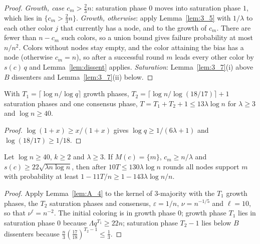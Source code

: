 \begin{proof}
  \emph{Growth, case $c_m > \frac23 n$}: saturation phase $0$ moves into
  saturation phase $1$, which lies in $\{c_m > \frac23 n\}$.
  \emph{Growth, otherwise}: apply Lemma~\ref{lem:3_5} with $1/\lambda$ to each
  other color $j$ that currently has a node, and to the growth of $c_m$. There
  are fewer than $n - c_m$ such colors, so a union bound gives failure
  probability at most $n/n^2$. Colors without nodes stay empty, and the color
  attaining the bias has a node (otherwise $c_m = n$), so after a successful
  round $m$ leads every other color by $s(c)\,q$ and
  Lemma~\ref{lem:dissent} applies.
  \emph{Saturation}: Lemma~\ref{lem:3_7}(i) above $B$ dissenters and
  Lemma~\ref{lem:3_7}(ii) below.
\end{proof}

\begin{lemma}\label{lem:phases}
  \leanok
  With $T_1 = \lceil \log n/\log q\rceil$ growth phases,
  $T_2 = \lceil \log n/\log(18/17)\rceil + 1$ saturation phases and one
  consensus phase, $T = T_1 + T_2 + 1 \le 13\lambda\log n$ for $\lambda \ge 3$
  and $\log n \ge 40$.
\end{lemma}

\begin{proof}
  $\log(1+x) \ge x/(1+x)$ gives $\log q \ge 1/(6\lambda+1)$ and
  $\log(18/17) \ge 1/18$.
\end{proof}

\begin{theorem}\label{thm:3_8}
  \leanok
  Let $\log n \ge 40$, $k \ge 2$ and $\lambda \ge 3$. If $M(c) = \{m\}$,
  $c_m \ge n/\lambda$ and $s(c) \ge 22\sqrt{\lambda n\log n}$, then after
  $10T \le 130\lambda\log n$ rounds all nodes support $m$ with probability
  at least $1 - 11T/n \ge 1 - 143\lambda\log n/n$.
\end{theorem}

\begin{proof}
  Apply Lemma~\ref{lem:A_4} to the kernel of 3-majority with the $T_1$
  growth phases, the $T_2$ saturation phases and consensus,
  $\varepsilon = 1/n$, $\nu = n^{-1/5}$ and $\ell = 10$, so that
  $\nu^\ell = n^{-2}$. The initial coloring is in growth phase $0$; growth
  phase $T_1$ lies in saturation phase $0$ because $\Lambda q^{T_1} \ge 22n$;
  saturation phase $T_2 - 1$ lies below $B$ dissenters because
  $\frac n3(\frac{17}{18})^{T_2-1} \le \frac13$.
\end{proof}


